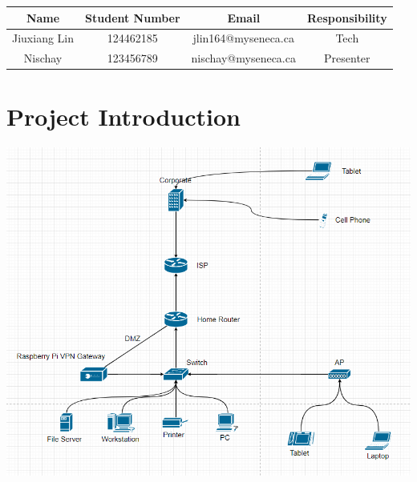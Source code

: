 \documentclass[12pt]{article}
\begin{document}
\begin{tabular}{| c | c | c | c |}
\hline
\textbf{Name} & \textbf{Student Number} & \textbf{Email} & \textbf{Responsibility} \\\hline
Jiuxiang Lin & 124462185 & jlin164@myseneca.ca & Tech \\\hline
Nischay & 123456789 & nischay@myseneca.ca & Presenter \\\hline
\end{tabular}

\section{Project Introduction}

\begin{center}
\includegraphics[scale=0.6]{topology.png}\\[1cm]
\end{center}
\end{document}
